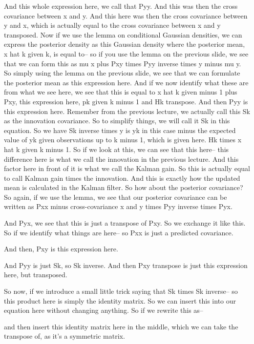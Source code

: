 And this whole expression here, we call that Pyy.
And this was then the cross covariance between x and y.
And this here was then the cross covariance between y
and x, which is actually equal to the cross covariance
between x and y transposed.
Now if we use the lemma on conditional Gaussian densities,
we can express the posterior density
as this Gaussian density where the posterior mean, x hat k
given k, is equal to--
so if you use the lemma on the previous slide,
we see that we can form this as mu x plus Pxy times Pyy
inverse times y minus mu y.
So simply using the lemma on the previous slide,
we see that we can formulate the posterior mean
as this expression here.
And if we now identify what these
are from what we see here, we see
that this is equal to x hat k given minus 1
plus Pxy, this expression here, pk given k minus 1
and Hk transpose.
And then Pyy is this expression here.
Remember from the previous lecture,
we actually call this Sk as the innovation covariance.
So to simplify things, we will call it Sk in this equation.
So we have Sk inverse times y is yk in this case
minus the expected value of yk given observations
up to k minus 1, which is given here.
Hk times x hat k given k minus 1.
So if we look at this, we can see that this here--
this difference here is what we call the innovation
in the previous lecture.
And this factor here in front of it
is what we call the Kalman gain.
So this is actually equal to call Kalman gain
times the innovation.
And this is exactly how the updated mean is calculated
in the Kalman filter.
So how about the posterior covariance?
So again, if we use the lemma, we
see that our posterior covariance
can be written as Pxx minus cross-covariance x and y
times Pyy inverse times Pyx.

And Pyx, we see that this is just a transpose of Pxy.
So we exchange it like this.
So if we identify what things are here-- so Pxx
is just a predicted covariance.

And then, Pxy is this expression here.

And Pyy is just Sk, so Sk inverse.
And then Pxy transpose is just this expression here,
but transposed.

So now, if we introduce a small little trick saying that Sk
times Sk inverse--
so this product here is simply the identity matrix.
So we can insert this into our equation
here without changing anything.
So if we rewrite this as--

and then insert this identity matrix here
in the middle, which we can take the transpose of,
as it's a symmetric matrix.

